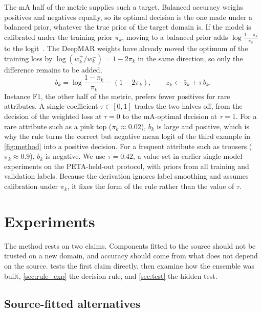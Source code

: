 \documentclass[10pt,twocolumn,letterpaper]{article}
\begin{document}
The mA half of the metric supplies such a target. Balanced accuracy weighs positives and negatives equally, so its optimal decision is the one made under a balanced prior, whatever the true prior of the target domain is. If the model is calibrated under the training prior $\pi_k$, moving to a balanced prior adds $\log\frac{1-\pi_k}{\pi_k}$ to the logit~\cite{saerens,logitadj}. The DeepMAR weights have already moved the optimum of the training loss by $\log(w_k^{+}/w_k^{-})=1-2\pi_k$ in the same direction, so only the difference remains to be added,
\begin{equation}
b_k=\log\frac{1-\pi_k}{\pi_k}-(1-2\pi_k),\qquad z_k \leftarrow \bar z_k+\tau\,b_k .
\label{eq:rule}
\end{equation}
Instance F1, the other half of the metric, prefers fewer positives for rare attributes. A single coefficient $\tau\in[0,1]$ trades the two halves off, from the decision of the weighted loss at $\tau=0$ to the mA-optimal decision at $\tau=1$. For a rare attribute such as a pink top ($\pi_k\approx0.02$), $b_k$ is large and positive, which is why the rule turns the correct but negative mean logit of the third example in \cref{fig:method} into a positive decision. For a frequent attribute such as trousers ($\pi_k\approx0.9$), $b_k$ is negative. We use $\tau=0.42$, a value set in earlier single-model experiments on the PETA-held-out protocol, with priors from all training and validation labels. Because the derivation ignores label smoothing and assumes calibration under $\pi_k$, it fixes the form of the rule rather than the value of $\tau$.

\section{Experiments}
\label{sec:experiments}

The method rests on two claims. Components fitted to the source should not be trusted on a new domain, and accuracy should come from what does not depend on the source.  tests the first claim directly.  then examine how the ensemble was built, \cref{sec:rule_exp} the decision rule, and \cref{sec:test} the hidden test.

\subsection{Source-fitted alternatives}
\label{sec:fitting}
\end{document}
